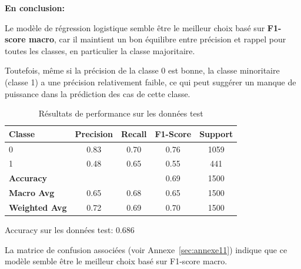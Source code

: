 \begin{flushleft}
\textbf{En conclusion:} 

Le modèle de régression logistique semble être le meilleur choix basé sur \textbf{F1-score macro}, car il maintient un bon équilibre entre précision et rappel pour toutes les classes, en particulier la classe majoritaire.

Toutefois, même si la précision de la classe 0 est bonne, la classe minoritaire (classe 1) a une précision relativement faible, ce qui peut suggérer un manque de puissance dans la prédiction des cas de cette classe.
\end{flushleft}


\begin{table}[h]
\centering
\caption{Résultats de performance sur les données test}
\label{tab:performance_validation_Vali}
\begin{tabular}{|l|c|c|c|c|}
\hline
\textbf{Classe}       & \textbf{Precision} & \textbf{Recall} & \textbf{F1-Score} & \textbf{Support} \\ \hline
0                     & 0.83               & 0.70            & 0.76              & 1059             \\ \hline
1                     & 0.48               & 0.65            & 0.55              & 441              \\ \hline
\textbf{Accuracy} & \multicolumn{2}{|c|}{} & 0.69            & 1500     \\ \hline
\textbf{Macro Avg}    & 0.65               & 0.68            & 0.65              & 1500             \\ \hline
\textbf{Weighted Avg} & 0.72               & 0.69            & 0.70              & 1500             \\ \hline
\end{tabular}
\begin{flushleft}
Accuracy sur les données test: 0.686
\end{flushleft}
\end{table}

\begin{flushleft}
La matrice de confusion associées (voir Annexe~\ref{sec:annexe11}) indique que ce modèle semble être le meilleur choix basé sur F1-score macro. 
\end{flushleft}
